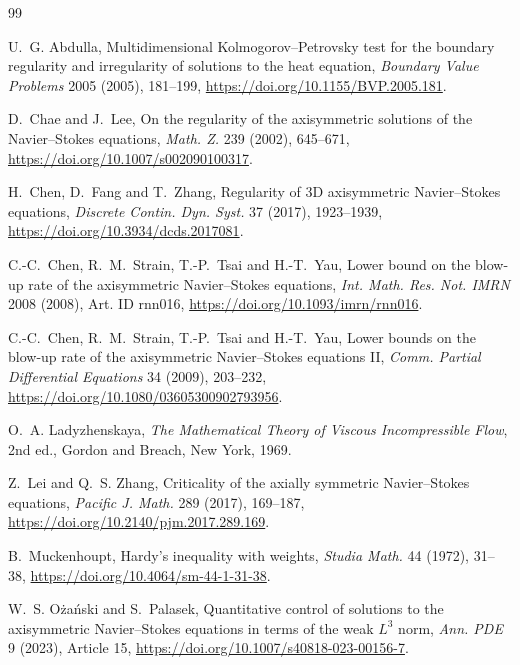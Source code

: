 \documentclass[11pt]{article}
\numberwithin{equation}{section}
\theoremstyle{definition}
\begin{document}
\begin{thebibliography}{99}

U.~G. Abdulla,
\newblock Multidimensional Kolmogorov--Petrovsky test for the boundary regularity and irregularity of solutions to the heat equation,
\newblock \emph{Boundary Value Problems} 2005 (2005), 181--199,
\newblock \url{https://doi.org/10.1155/BVP.2005.181}.

D.~Chae and J.~Lee,
\newblock On the regularity of the axisymmetric solutions of the Navier--Stokes equations,
\newblock \emph{Math. Z.} 239 (2002), 645--671,
\newblock \url{https://doi.org/10.1007/s002090100317}.

H.~Chen, D.~Fang and T.~Zhang,
\newblock Regularity of 3D axisymmetric Navier--Stokes equations,
\newblock \emph{Discrete Contin. Dyn. Syst.} 37 (2017), 1923--1939,
\newblock \url{https://doi.org/10.3934/dcds.2017081}.

C.-C.~Chen, R.~M.~Strain, T.-P.~Tsai and H.-T.~Yau,
\newblock Lower bound on the blow-up rate of the axisymmetric Navier--Stokes equations,
\newblock \emph{Int. Math. Res. Not. IMRN} 2008 (2008), Art. ID rnn016,
\newblock \url{https://doi.org/10.1093/imrn/rnn016}.

C.-C.~Chen, R.~M.~Strain, T.-P.~Tsai and H.-T.~Yau,
\newblock Lower bounds on the blow-up rate of the axisymmetric Navier--Stokes equations II,
\newblock \emph{Comm. Partial Differential Equations} 34 (2009), 203--232,
\newblock \url{https://doi.org/10.1080/03605300902793956}.

O.~A. Ladyzhenskaya,
\newblock \emph{The Mathematical Theory of Viscous Incompressible Flow},
\newblock 2nd ed., Gordon and Breach, New York, 1969.

Z.~Lei and Q.~S. Zhang,
\newblock Criticality of the axially symmetric Navier--Stokes equations,
\newblock \emph{Pacific J. Math.} 289 (2017), 169--187,
\newblock \url{https://doi.org/10.2140/pjm.2017.289.169}.

B.~Muckenhoupt,
\newblock Hardy's inequality with weights,
\newblock \emph{Studia Math.} 44 (1972), 31--38,
\newblock \url{https://doi.org/10.4064/sm-44-1-31-38}.

W.~S. O\.{z}a\'nski and S.~Palasek,
\newblock Quantitative control of solutions to the axisymmetric Navier--Stokes equations in terms of the weak $L^3$ norm,
\newblock \emph{Ann. PDE} 9 (2023), Article 15,
\newblock \url{https://doi.org/10.1007/s40818-023-00156-7}.


\end{thebibliography}
\end{document}

